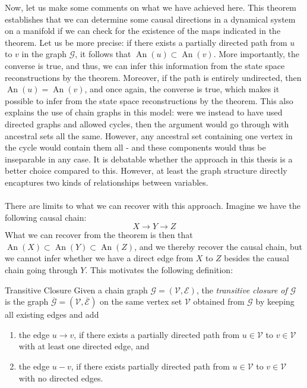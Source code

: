 \documentclass[11pt, a4paper]{memoir}
\theoremstyle{break}
\theoremstyle{break}
\theoremstyle{nonumberplain}
\DeclareMathOperator{\an}{An}
\begin{document}
Now, let us make some comments on what we have achieved here. This theorem establishes that we can determine some causal directions in a dynamical system on a manifold if we can check for the existence of the maps indicated in the theorem. Let us be more precise: if there exists a partially directed path from $u$ to $v$ in the graph $\mathcal{G}$, it follows that $\an(u)\subset \an(v)$. More importantly, the converse is true, and thus, we can infer this information from the state space reconstructions by the theorem. Moreover, if the path is entirely undirected, then $\an(u)=\an(v)$, and once again, the converse is true, which makes it possible to infer from the state space reconstructions by the theorem. This also explains the use of chain graphs in this model: were we instead to have used directed graphs and allowed cycles, then the argument would go through with ancestral sets all the same. However, any ancestral set containing one vertex in the cycle would contain them all - and these components would thus be inseparable in any case. It is debatable whether the approach in this thesis is a better choice compared to this. However, at least the graph structure directly encaptures two kinds of relationships between variables.\\\\
There are limits to what we can recover with this approach. Imagine we have the following causal chain:
$$X\rightarrow Y\rightarrow Z$$
What we can recover from the theorem is then that $\an(X)\subset \an(Y)\subset \an(Z)$, and we thereby recover the causal chain, but we cannot infer whether we have a direct edge from $X$ to $Z$ besides the causal chain going through $Y$. This motivates the following definition:
\begin{mydefinition}{Transitive Closure}
Given a chain graph $\mathcal{G}=(\mathcal{V},\mathcal{E})$, the \emph{transitive  closure of $\mathcal{G}$} is the graph $\overline{\mathcal{G}}=(\mathcal{V},\overline{\mathcal{E}})$ on the same vertex set $\mathcal{V}$ obtained from $\mathcal{G}$ by keeping all existing edges and add
\begin{enumerate}[label=\roman*)]
	\item the edge $u\to v$, if there exists a partially directed path from $u\in \mathcal{V}$ to $v\in \mathcal{V}$ with at least one directed edge, and
	\item the edge $u-v$, if there exists  partially directed path from $u\in \mathcal{V}$ to $v\in \mathcal{V}$ with no directed edges.
\end{enumerate} 
\end{mydefinition}
\end{document}

